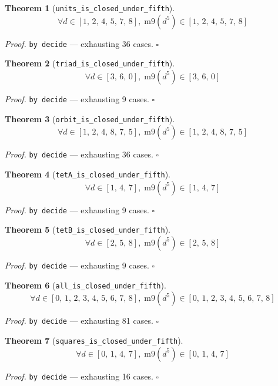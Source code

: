 \documentclass[11pt]{article}
\newtheorem{theorem}{Theorem}[section]
\begin{document}
\begin{theorem}[\texttt{units\_is\_closed\_under\_fifth}]
\[ \forall d \in [1,\,2,\,4,\,5,\,7,\,8],\; \mathrm{m9}\mathopen{}\left(d^{5}\right) \in [1,\,2,\,4,\,5,\,7,\,8] \]
\end{theorem}
\noindent\emph{Proof.} \texttt{by decide} --- exhausting 36 cases. \hfill$\square$

\begin{theorem}[\texttt{triad\_is\_closed\_under\_fifth}]
\[ \forall d \in [3,\,6,\,0],\; \mathrm{m9}\mathopen{}\left(d^{5}\right) \in [3,\,6,\,0] \]
\end{theorem}
\noindent\emph{Proof.} \texttt{by decide} --- exhausting 9 cases. \hfill$\square$

\begin{theorem}[\texttt{orbit\_is\_closed\_under\_fifth}]
\[ \forall d \in [1,\,2,\,4,\,8,\,7,\,5],\; \mathrm{m9}\mathopen{}\left(d^{5}\right) \in [1,\,2,\,4,\,8,\,7,\,5] \]
\end{theorem}
\noindent\emph{Proof.} \texttt{by decide} --- exhausting 36 cases. \hfill$\square$

\begin{theorem}[\texttt{tetA\_is\_closed\_under\_fifth}]
\[ \forall d \in [1,\,4,\,7],\; \mathrm{m9}\mathopen{}\left(d^{5}\right) \in [1,\,4,\,7] \]
\end{theorem}
\noindent\emph{Proof.} \texttt{by decide} --- exhausting 9 cases. \hfill$\square$

\begin{theorem}[\texttt{tetB\_is\_closed\_under\_fifth}]
\[ \forall d \in [2,\,5,\,8],\; \mathrm{m9}\mathopen{}\left(d^{5}\right) \in [2,\,5,\,8] \]
\end{theorem}
\noindent\emph{Proof.} \texttt{by decide} --- exhausting 9 cases. \hfill$\square$

\begin{theorem}[\texttt{all\_is\_closed\_under\_fifth}]
\[ \forall d \in [0,\,1,\,2,\,3,\,4,\,5,\,6,\,7,\,8],\; \mathrm{m9}\mathopen{}\left(d^{5}\right) \in [0,\,1,\,2,\,3,\,4,\,5,\,6,\,7,\,8] \]
\end{theorem}
\noindent\emph{Proof.} \texttt{by decide} --- exhausting 81 cases. \hfill$\square$

\begin{theorem}[\texttt{squares\_is\_closed\_under\_fifth}]
\[ \forall d \in [0,\,1,\,4,\,7],\; \mathrm{m9}\mathopen{}\left(d^{5}\right) \in [0,\,1,\,4,\,7] \]
\end{theorem}
\noindent\emph{Proof.} \texttt{by decide} --- exhausting 16 cases. \hfill$\square$
\end{document}
